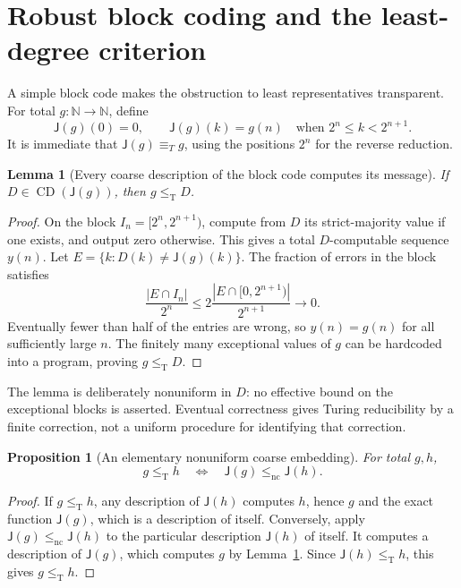 \documentclass[11pt,a4paper]{article}
\newcommand{\N}{\mathbb N}
\newcommand{\leT}{\leq_{\mathrm T}}
\newcommand{\CD}{\operatorname{CD}}
\newcommand{\nc}{\mathrm{nc}}
\newcommand{\J}{\mathsf J}
\newtheorem{lemma}[theorem]{Lemma}
\newtheorem{proposition}[theorem]{Proposition}
\theoremstyle{definition}\newtheorem{definition}[theorem]{Definition}
\theoremstyle{remark}\newtheorem{remark}[theorem]{Remark}
\begin{document}
\section{Robust block coding and the least-degree criterion}
\label{sec:coarsening}

A simple block code makes the obstruction to least representatives transparent. For total $g:\N\to\N$, define
\begin{equation}\label{eq:blockcode}
 \J(g)(0)=0,\qquad
 \J(g)(k)=g(n)\quad\text{when }2^n\le k<2^{n+1}.
\end{equation}
It is immediate that $\J(g)\equiv_T g$, using the positions $2^n$ for the reverse reduction.

\begin{lemma}[Every coarse description of the block code computes its message]
\label{lem:robust}
If $D\in\CD(\J(g))$, then $g\leT D$.
\end{lemma}
\begin{proof}
On the block $I_n=[2^n,2^{n+1})$, compute from $D$ its strict-majority value if one exists, and output zero otherwise. This gives a total $D$-computable sequence $y(n)$. Let $E=\{k:D(k)\ne\J(g)(k)\}$. The fraction of errors in the block satisfies
\[
 \frac{|E\cap I_n|}{2^n}
 \le 2\frac{|E\cap[0,2^{n+1})|}{2^{n+1}}
       \longrightarrow0.
\]
Eventually fewer than half of the entries are wrong, so $y(n)=g(n)$ for all sufficiently large $n$. The finitely many exceptional values of $g$ can be hardcoded into a program, proving $g\leT D$.
\end{proof}

The lemma is deliberately nonuniform in $D$: no effective bound on the exceptional blocks is asserted. Eventual correctness gives Turing reducibility by a finite correction, not a uniform procedure for identifying that correction.

\begin{proposition}[An elementary nonuniform coarse embedding]
\label{prop:embedding}
For total $g,h$,
\[
             g\leT h\quad\Longleftrightarrow\quad
                         \J(g)\le_\nc\J(h).
\]
\end{proposition}
\begin{proof}
If $g\leT h$, any description of $\J(h)$ computes $h$, hence $g$ and the exact function $\J(g)$, which is a description of itself. Conversely, apply $\J(g)\le_\nc\J(h)$ to the particular description $\J(h)$ of itself. It computes a description of $\J(g)$, which computes $g$ by Lemma~\ref{lem:robust}. Since $\J(h)\leT h$, this gives $g\leT h$.
\end{proof}
\end{document}
